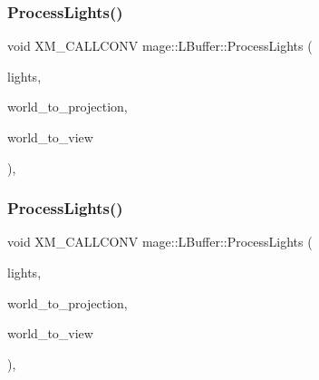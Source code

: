 \subsubsection{\texorpdfstring{Process\+Lights()}{ProcessLights()}\hspace{0.1cm}{\footnotesize\ttfamily [2/3]}}
{\footnotesize\ttfamily void X\+M\+\_\+\+C\+A\+L\+L\+C\+O\+NV mage\+::\+L\+Buffer\+::\+Process\+Lights (\begin{DoxyParamCaption}\item[{const vector$<$ const \hyperlink{namespacemage_a1724c6e6b6b5ba535cdd967cbbb4a669}{Omni\+Light\+Node} $\ast$ $>$ \&}]{lights,  }\item[{F\+X\+M\+M\+A\+T\+R\+IX}]{world\+\_\+to\+\_\+projection,  }\item[{F\+X\+M\+M\+A\+T\+R\+IX}]{world\+\_\+to\+\_\+view }\end{DoxyParamCaption})\hspace{0.3cm}{\ttfamily [private]}, {\ttfamily [noexcept]}}

\hypertarget{structmage_1_1_l_buffer_a86cc56a08308047347002cf6d39cc3b7}{}\label{structmage_1_1_l_buffer_a86cc56a08308047347002cf6d39cc3b7} 
\subsubsection{\texorpdfstring{Process\+Lights()}{ProcessLights()}\hspace{0.1cm}{\footnotesize\ttfamily [3/3]}}
{\footnotesize\ttfamily void X\+M\+\_\+\+C\+A\+L\+L\+C\+O\+NV mage\+::\+L\+Buffer\+::\+Process\+Lights (\begin{DoxyParamCaption}\item[{const vector$<$ const \hyperlink{namespacemage_aeed5dee4ff6c591eabb0e9114256df4a}{Spot\+Light\+Node} $\ast$ $>$ \&}]{lights,  }\item[{F\+X\+M\+M\+A\+T\+R\+IX}]{world\+\_\+to\+\_\+projection,  }\item[{F\+X\+M\+M\+A\+T\+R\+IX}]{world\+\_\+to\+\_\+view }\end{DoxyParamCaption})\hspace{0.3cm}{\ttfamily [private]}, {\ttfamily [noexcept]}}

\hypertarget{structmage_1_1_l_buffer_a20635b79d83b07a07ffbdf7fd6a4861c}{}\label{structmage_1_1_l_buffer_a20635b79d83b07a07ffbdf7fd6a4861c} 
